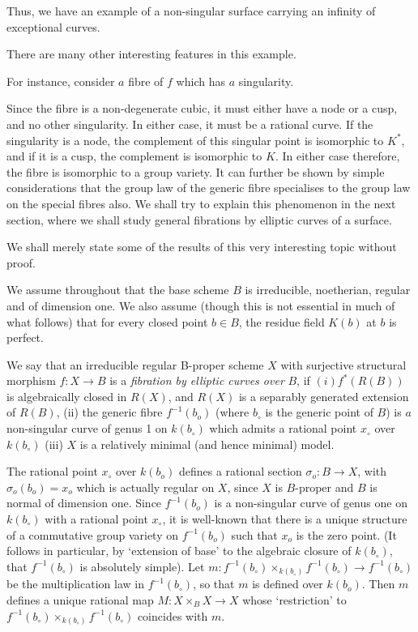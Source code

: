 Thus, we have an example of a non-singular surface carrying an
infinity of exceptional curves. 

There are many other interesting features in this example.

For instance, consider $a$ fibre of $f$  which has $a$ singularity.

Since the fibre is a  non-degenerate cubic, it must either have a node
or a cusp, and no other singularity. In either case, it must be a
rational curve. If the singularity is a  node, the complement of this
singular point is isomorphic to $K^*$, and if it is a cusp, the
complement is isomorphic to $K$. In either case therefore, the
fibre is isomorphic to a group variety. It can further be shown by
simple considerations that the group law of the generic fibre
specialises to the group law on the special fibres also. We shall try
to explain this phenomenon  in the next section, where we shall study
general fibrations by  elliptic curves of a surface. 

\bigskip


We shall merely state some of the results of this  very interesting
topic without proof. 

We assume throughout that the base scheme $B$ is irreducible,\pageoriginale
noetherian, regular and of dimension one. We also assume (though this
is not essential in much of what follows) that for every closed point
$b\in B$,  the residue field $K(b)$ at $b$ is  perfect. 

We say that  an irreducible regular B-proper scheme $X$ with
surjective structural morphism $ f: X \rightarrow B $ is a
\textit{fibration by elliptic curves over} $B$, if $(i)f^* (R(B))$ is
algebraically closed in $R(X)$, and $R(X)$ is a separably generated
extension of $R(B)$, (ii) the generic fibre  $ f^{-1}(b_o)$  (where
$b_\circ$ is the generic point of $B$) is $a$ non-singular curve of genus
1 on $k(b_\circ)$ which admits a rational point $x_\circ$ over
$k(b_\circ)$ (iii) $X$ is a relatively minimal (and hence minimal)
model.  

The rational point $ x_\circ$ over $k(b_o)$ defines a rational
section $\sigma_o : B \to X$, with $\sigma_o (b_o)=x_o$ which is
actually regular on $X$, since $X$ is $B$-proper and $B$ is normal of
dimension one. Since $ f^{-1}(b_o)$ is a non-singular curve of genus
one on $k(b_\circ)$ with a rational point $x_\circ$, it is well-known
that there is a unique structure of a commutative group variety on 
 $ f^{-1}(b_o)$ such  that $x_o$ is the zero point. (It follows
in particular, by `extension of base' to the algebraic closure of
$k(b_\circ)$, that $f^{-1}(b_\circ)$ is absolutely simple). Let $m: 
f^{-1}(b_\circ) \times_{k(b_\circ)} f^{-1}(b_\circ) \to f^{-1}
(b_\circ)$ be the multiplication  law in $f^{-1}(b_\circ)$, so that
$m$ is  defined over $k(b_o)$. Then $m$ defines a unique
rational map $M:X \times_B X \rightarrow X $ whose `restriction' to
$ f^{-1}(b_\circ) \times_{k(b_\circ)} f^{-1}(b_\circ)$ coincides 
with $m$. 


